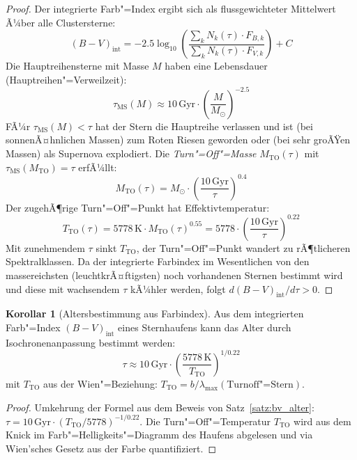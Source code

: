 ﻿\documentclass[a4paper,12pt]{article}
\theoremstyle{definition}
\newtheorem{korollar}{Korollar}
\begin{document}
\begin{proof}
    Der integrierte Farb"=Index ergibt sich als flussgewichteter Mittelwert
    Ã¼ber alle Clustersterne:
    \[
        (B-V)_{\text{int}} = -2.5\log_{10}\!\left(
        \frac{\sum_k N_k(\tau) \cdot F_{B,k}}{\sum_k N_k(\tau) \cdot F_{V,k}}
        \right) + C
    \]
    Die Hauptreihensterne mit Masse $M$ haben eine Lebensdauer
    (Hauptreihen"=Verweilzeit):
    \[
        \tau_{\text{MS}}(M) \approx 10\,\text{Gyr} \cdot \left(\frac{M}{M_\odot}\right)^{-2.5}
    \]
    FÃ¼r $\tau_{\text{MS}}(M) < \tau$ hat der Stern die Hauptreihe verlassen
    und ist (bei sonnenÃ¤hnlichen Massen) zum Roten Riesen geworden
    oder (bei sehr groÃŸen Massen) als Supernova explodiert.
    Die \emph{Turn"=Off"=Masse} $M_{\text{TO}}(\tau)$ mit
    $\tau_{\text{MS}}(M_{\text{TO}}) = \tau$ erfÃ¼llt:
    \[
        M_{\text{TO}}(\tau) = M_\odot \cdot \left(\frac{10\,\text{Gyr}}{\tau}\right)^{0.4}
    \]
    Der zugehÃ¶rige Turn"=Off"=Punkt hat Effektivtemperatur:
    \[
        T_{\text{TO}}(\tau) = 5778\,\text{K} \cdot M_{\text{TO}}(\tau)^{0.55}
        = 5778 \cdot \left(\frac{10\,\text{Gyr}}{\tau}\right)^{0.22}
    \]
    Mit zunehmendem $\tau$ sinkt $T_{\text{TO}}$, der Turn"=Off"=Punkt
    wandert zu rÃ¶tlicheren Spektralklassen. Da der integrierte Farbindex
    im Wesentlichen von den massereichsten (leuchtkrÃ¤ftigsten) noch
    vorhandenen Sternen bestimmt wird und diese mit wachsendem $\tau$
    kÃ¼hler werden, folgt $d(B-V)_{\text{int}}/d\tau > 0$. \qedhere
\end{proof}

\begin{korollar}[Altersbestimmung aus Farbindex]
\label{kor:alter_farbe}
    Aus dem integrierten Farb"=Index $(B-V)_{\text{int}}$ eines Sternhaufens
    kann das Alter durch Isochronenanpassung bestimmt werden:
    \[
        \tau \approx 10\,\text{Gyr} \cdot
        \left(\frac{5778\,\text{K}}{T_{\text{TO}}}\right)^{1/0.22}
    \]
    mit $T_{\text{TO}}$ aus der Wien"=Beziehung:
    $T_{\text{TO}} = b / \lambda_{\max}(\text{Turnoff"=Stern})$.
\end{korollar}

\begin{proof}
    Umkehrung der Formel aus dem Beweis von Satz~\ref{satz:bv_alter}:
    $\tau = 10\,\text{Gyr} \cdot (T_{\text{TO}}/5778)^{-1/0.22}$.
    Die Turn"=Off"=Temperatur $T_{\text{TO}}$ wird aus dem Knick
    im Farb"=Helligkeits"=Diagramm des Haufens abgelesen und via
    Wien'sches Gesetz aus der Farbe quantifiziert. \qedhere
\end{proof}
\end{document}
